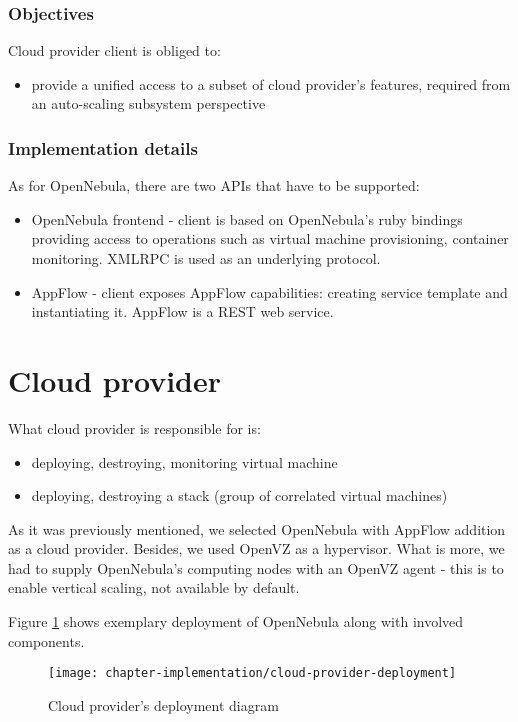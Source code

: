 \subsubsection{Objectives}
Cloud provider client is obliged to:

\begin{itemize}
 \item provide a unified access to a subset of cloud provider's features, required from an auto-scaling subsystem perspective
\end{itemize}

\subsubsection{Implementation details}
As for OpenNebula, there are two APIs that have to be supported:
\begin{itemize}
 \item OpenNebula frontend - client is based on OpenNebula's ruby bindings providing access to operations such as virtual machine provisioning, container monitoring. XMLRPC is used as an underlying protocol.
 \item AppFlow - client exposes AppFlow capabilities: creating service template and instantiating it. AppFlow is a REST web service.
\end{itemize}

\section{Cloud provider}
What cloud provider is responsible for is:
\begin{itemize}
 \item deploying, destroying, monitoring virtual machine
 \item deploying, destroying a stack (group of correlated virtual machines)
\end{itemize}

As it was previously mentioned, we selected OpenNebula with AppFlow addition as a cloud provider. Besides, we used OpenVZ as a hypervisor. What is more, we had to supply OpenNebula's computing nodes with an OpenVZ agent - this is to enable vertical scaling, not available by default.

Figure \ref{fig:cloud-provider-deployment} shows exemplary deployment of OpenNebula along with involved components.

\begin{figure}[!ht]
  \begin{center}
    \texttt{[image: chapter-implementation/cloud-provider-deployment]}
  \end{center}
  \caption{Cloud provider's deployment diagram}
  \label{fig:cloud-provider-deployment}
\end{figure}

